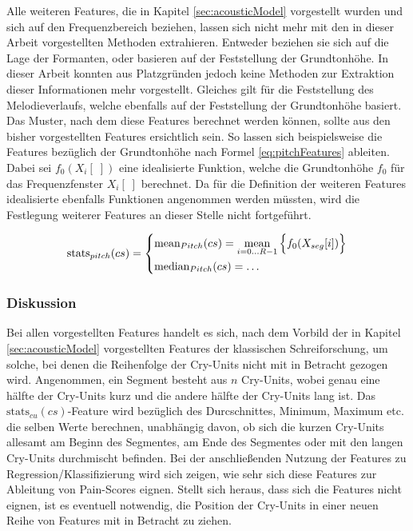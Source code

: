 Alle weiteren Features, die in Kapitel \ref{sec:acousticModel} vorgestellt wurden und sich auf den Frequenzbereich beziehen, lassen sich nicht mehr mit den in dieser Arbeit vorgestellten Methoden extrahieren. Entweder beziehen sie sich auf die Lage der Formanten, oder basieren auf der Feststellung der Grundtonhöhe. In dieser Arbeit konnten aus Platzgründen jedoch keine Methoden zur Extraktion dieser Informationen mehr vorgestellt. Gleiches gilt für die Feststellung des Melodieverlaufs, welche ebenfalls auf der Feststellung der Grundtonhöhe basiert. Das Muster, nach dem diese Features berechnet werden können, sollte aus den bisher vorgestellten Features ersichtlich sein. So lassen sich beispielsweise die Features bezüglich der Grundtonhöhe nach Formel \ref{eq:pitchFeatures} ableiten. Dabei sei $f_0(X_i[\;])$ eine idealisierte Funktion, welche die Grundtonhöhe $f_0$ für das Frequenzfenster $X_i[\;]$ berechnet. Da für die Definition der weiteren Features idealisierte ebenfalls Funktionen angenommen werden müssten, wird die Festlegung weiterer Features an dieser Stelle nicht fortgeführt. 

\begin{equation}
\text{stats}_{pitch}(cs) = 
\begin{dcases}
\text{mean}_{Pitch}(cs) = \operatorname*{mean}_{i=0\ldots R-1} \Big\{ f_0(X_{seg}[i]) \Big\} \\
\text{median}_{Pitch}(cs) = \ldots
\end{dcases}
\label{eq:pitchFeatures}
\end{equation}

\subsubsection*{Diskussion}

Bei allen vorgestellten Features handelt es sich, nach dem Vorbild der in Kapitel \ref{sec:acousticModel} vorgestellten Features der klassischen Schreiforschung, um solche, bei denen die Reihenfolge der Cry-Units nicht mit in Betracht gezogen wird. Angenommen, ein Segment besteht aus $n$ Cry-Units, wobei genau eine hälfte der  Cry-Units kurz und die andere hälfte der Cry-Units lang ist. Das $\text{stats}_{cu}(cs)$-Feature wird bezüglich des Durcschnittes, Minimum, Maximum etc. die selben Werte berechnen, unabhängig davon, ob sich die kurzen Cry-Units allesamt am Beginn des Segmentes, am Ende des Segmentes oder mit den langen Cry-Units durchmischt befinden. Bei der anschließenden Nutzung der Features zu Regression/Klassifizierung wird sich zeigen, wie sehr sich diese Features zur Ableitung von Pain-Scores eignen. Stellt sich heraus, dass sich die Features nicht eignen, ist es eventuell notwendig, die Position der Cry-Units in einer neuen Reihe von Features mit in Betracht zu ziehen.

